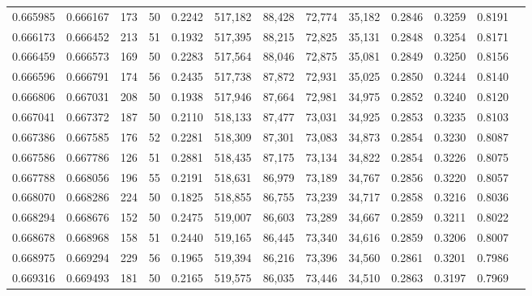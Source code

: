 \begin{tabular}{rrrrrrrrrrrrr}
0.665985 & 0.666167 &   173 &  50 &                                     0.2242 & 517,182 &  88,428 &  72,774 &  35,182 & 0.2846 & 0.3259 & 0.8191 \\
0.666173 & 0.666452 &   213 &  51 &                                     0.1932 & 517,395 &  88,215 &  72,825 &  35,131 & 0.2848 & 0.3254 & 0.8171 \\
0.666459 & 0.666573 &   169 &  50 &                                     0.2283 & 517,564 &  88,046 &  72,875 &  35,081 & 0.2849 & 0.3250 & 0.8156 \\
0.666596 & 0.666791 &   174 &  56 &                                     0.2435 & 517,738 &  87,872 &  72,931 &  35,025 & 0.2850 & 0.3244 & 0.8140 \\
0.666806 & 0.667031 &   208 &  50 &                                     0.1938 & 517,946 &  87,664 &  72,981 &  34,975 & 0.2852 & 0.3240 & 0.8120 \\
0.667041 & 0.667372 &   187 &  50 &                                     0.2110 & 518,133 &  87,477 &  73,031 &  34,925 & 0.2853 & 0.3235 & 0.8103 \\
0.667386 & 0.667585 &   176 &  52 &                                     0.2281 & 518,309 &  87,301 &  73,083 &  34,873 & 0.2854 & 0.3230 & 0.8087 \\
0.667586 & 0.667786 &   126 &  51 &                                     0.2881 & 518,435 &  87,175 &  73,134 &  34,822 & 0.2854 & 0.3226 & 0.8075 \\
0.667788 & 0.668056 &   196 &  55 &                                     0.2191 & 518,631 &  86,979 &  73,189 &  34,767 & 0.2856 & 0.3220 & 0.8057 \\
0.668070 & 0.668286 &   224 &  50 &                                     0.1825 & 518,855 &  86,755 &  73,239 &  34,717 & 0.2858 & 0.3216 & 0.8036 \\
0.668294 & 0.668676 &   152 &  50 &                                     0.2475 & 519,007 &  86,603 &  73,289 &  34,667 & 0.2859 & 0.3211 & 0.8022 \\
0.668678 & 0.668968 &   158 &  51 &                                     0.2440 & 519,165 &  86,445 &  73,340 &  34,616 & 0.2859 & 0.3206 & 0.8007 \\
0.668975 & 0.669294 &   229 &  56 &                                     0.1965 & 519,394 &  86,216 &  73,396 &  34,560 & 0.2861 & 0.3201 & 0.7986 \\
0.669316 & 0.669493 &   181 &  50 &                                     0.2165 & 519,575 &  86,035 &  73,446 &  34,510 & 0.2863 & 0.3197 & 0.7969 \\

\end{tabular}
